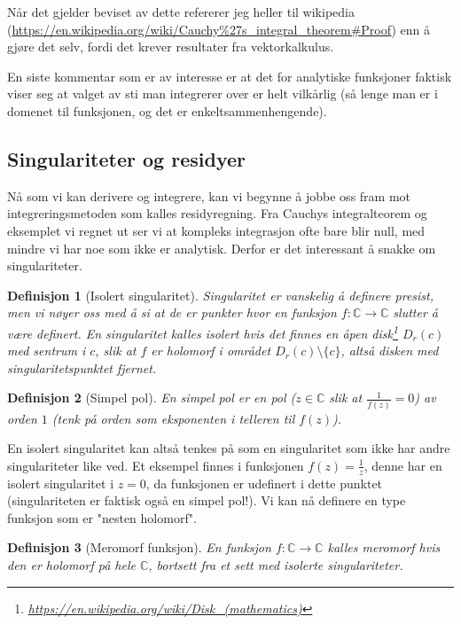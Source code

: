 \documentclass{article}
\newtheorem{definition}{Definisjon}
\begin{document}
Når det gjelder beviset av dette refererer jeg heller til wikipedia (\url{https://en.wikipedia.org/wiki/Cauchy%27s_integral_theorem#Proof}) enn å gjøre det selv, fordi det krever resultater fra vektorkalkulus.

En siste kommentar som er av interesse er at det for analytiske funksjoner faktisk viser seg at valget av sti man integrerer over er helt vilkårlig (så lenge man er i domenet til funksjonen, og det er enkeltsammenhengende).

\subsection{Singulariteter og residyer}

Nå som vi kan derivere og integrere, kan vi begynne å jobbe oss fram mot integreringsmetoden som kalles residyregning. Fra Cauchys integralteorem og eksemplet vi regnet ut ser vi at kompleks integrasjon ofte bare blir null, med mindre vi har noe som ikke er analytisk. Derfor er det interessant å snakke om singulariteter.

\begin{definition}[Isolert singularitet]
    Singularitet er vanskelig å definere presist, men vi nøyer oss med å si at de er punkter hvor en funksjon $f:\mathbb{C} \longrightarrow \mathbb{C}$ slutter å være definert. En singularitet kalles isolert hvis det finnes en åpen disk\footnote{\url{https://en.wikipedia.org/wiki/Disk_(mathematics)}} $D_r(c)$ med sentrum i $c$, slik at $f$ er holomorf i området $D_r(c) \setminus \{c\}$, altså disken med singularitetspunktet fjernet.
\end{definition}

\begin{definition}[Simpel pol]
    En simpel pol er en pol ($z \in \mathbb{C}$ slik at $\frac{1}{f(z)} = 0$) av orden $1$ (tenk på orden som eksponenten i telleren til $f(z)$).
\end{definition}

En isolert singularitet kan altså tenkes på som en singularitet som ikke har andre singulariteter like ved. Et eksempel finnes i funksjonen $f(z) = \frac{1}{z}$, denne har en isolert singularitet i $z = 0$, da funksjonen er udefinert i dette punktet (singulariteten er faktisk også en simpel pol!). Vi kan nå definere en type funksjon som er "nesten holomorf".

\begin{definition}[Meromorf funksjon]
    En funksjon $f:\mathbb{C} \longrightarrow \mathbb{C}$ kalles meromorf hvis den er holomorf på hele $\mathbb{C}$, bortsett fra et sett med isolerte singulariteter. 
\end{definition}
\end{document}

